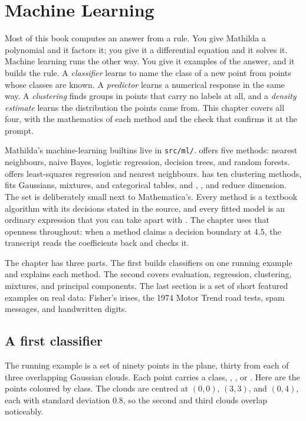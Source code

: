 \chapter{Machine Learning}
\label{ch:ml}

Most of this book computes an answer from a rule. You give Mathilda a polynomial
and it factors it; you give it a differential equation and it solves it. Machine
learning runs the other way. You give it examples of the answer, and it builds the
rule. A \emph{classifier} learns to name the class of a new point
from points whose classes are known. A \emph{predictor} learns a numerical response
in the same way. A \emph{clustering} finds groups in points that carry no labels at
all, and a \emph{density estimate} learns the distribution the points came from.
This chapter covers all four, with the mathematics of each method and the check
that confirms it at the prompt.

Mathilda's machine-learning builtins live in \texttt{src/ml/}.  offers
five methods: nearest neighbours, naive Bayes, logistic regression, decision trees,
and random forests.  offers least-squares regression and nearest
neighbours.  has ten clustering methods, 
fits Gaussians, mixtures, and categorical tables, and ,
, and  reduce dimension. The set is
deliberately small next to Mathematica's. Every method is a textbook algorithm
with its decisions stated in the source, and every fitted model is an ordinary
expression that you can take apart with . The chapter uses that openness
throughout: when a method claims a decision boundary at \(4.5\), the transcript
reads the coefficients back and checks it.

The chapter has three parts. The first builds classifiers on one running example
and explains each method. The second covers evaluation, regression, clustering,
mixtures, and principal components. The last section is a set of short featured
examples on real data: Fisher's irises, the 1974 Motor Trend road tests, spam
messages, and handwritten digits.

\section{A first classifier}
\label{sec:ml-first}

The running example is a set of ninety points in the plane, thirty from each of
three overlapping Gaussian clouds. Each point carries a class, ,
, or . Here are the points coloured by class. The clouds are
centred at \((0,0)\), \((3,3)\), and \((0,4)\), each with standard deviation
\(0.8\), so the second and third clouds overlap noticeably.

